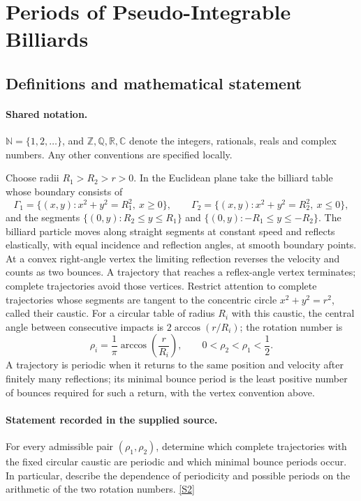 \documentclass[11pt]{article}
\newcommand{\sref}[2]{\hyperlink{source:#1:#2}{[S#2]}}
\begin{document}
\section{Periods of Pseudo-Integrable Billiards}\label{statement}

\subsection{Definitions and mathematical statement}

\paragraph{Shared notation.}$\mathbb N=\{1,2,\ldots\}$, and $\mathbb Z,\mathbb Q,\mathbb R,\mathbb C$ denote the integers, rationals, reals and complex numbers. Any other conventions are specified locally.


Choose radii \(R_1>R_2>r>0\). In the Euclidean plane take the billiard table whose boundary consists of
\[
\Gamma_1=\{(x,y):x^2+y^2=R_1^2,\ x\ge0\},\qquad
\Gamma_2=\{(x,y):x^2+y^2=R_2^2,\ x\le0\},
\]
and the segments \(\{(0,y):R_2\le y\le R_1\}\) and \(\{(0,y):-R_1\le y\le-R_2\}\). The billiard particle moves along straight segments at constant speed and reflects elastically, with equal incidence and reflection angles, at smooth boundary points. At a convex right-angle vertex the limiting reflection reverses the velocity and counts as two bounces. A trajectory that reaches a reflex-angle vertex terminates; complete trajectories avoid those vertices.
Restrict attention to complete trajectories whose segments are tangent to the concentric circle \(x^2+y^2=r^2\), called their caustic. For a circular table of radius \(R_i\) with this caustic, the central angle between consecutive impacts is \(2\arccos(r/R_i)\); the rotation number is
\[\rho_i=\frac1\pi\arccos\left(\frac r{R_i}\right),\qquad
0<\rho_2<\rho_1<\frac12.\]
A trajectory is periodic when it returns to the same position and velocity after finitely many reflections; its minimal bounce period is the least positive number of bounces required for such a return, with the vertex convention above.
\paragraph{Statement recorded in the supplied source.}
For every admissible pair \((\rho_1,\rho_2)\), determine which complete trajectories with the fixed circular caustic are periodic and which minimal bounce periods occur. In particular, describe the dependence of periodicity and possible periods on the arithmetic of the two rotation numbers. \sref{statement}{2}
\end{document}
